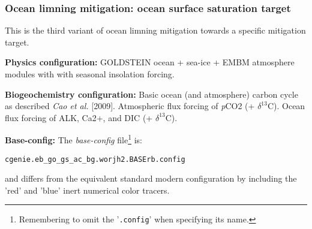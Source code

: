 \documentclass[10pt,twoside]{article}
\begin{document}
\subsubsection{Ocean limning mitigation: ocean surface saturation target}\label{EXAMPLE.worjh2.LIMNING.sattarget}

This is the third variant of ocean limning mitigation towards a specific mitigation target.

\noindent \textbf{Physics configuration:} GOLDSTEIN ocean + sea-ice + EMBM atmosphere modules with with seasonal insolation forcing.

\noindent \textbf{Biogeochemistry configuration:} Basic ocean (and atmosphere) carbon cycle as described \textit{Cao et al.} [2009]. Atmospheric flux forcing of \textit{p}CO2 (+ $\delta^{13}$C). Ocean flux forcing of ALK, Ca2+, and  DIC (+ $\delta^{13}$C).

\noindent \textbf{Base-config:} The \textit{base-config} file\footnote{Remembering to omit the '\texttt{.config}' when specifying its name.} is:
\vspace{-10pt}\begin{verbatim}cgenie.eb_go_gs_ac_bg.worjh2.BASErb.config\end{verbatim}\vspace{-10pt}
and differs from the equivalent standard modern configuration by including the 'red' and 'blue' inert numerical color tracers.
\end{document}
